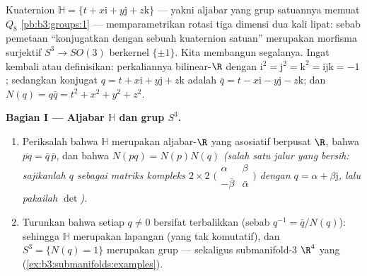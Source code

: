 \begin{problem}\label{pb:b3:submanifolds:1}
Kuaternion $\mathbb H = \{t + x\mathrm i + y\mathrm j +
z\mathrm k\}$ --- yakni aljabar yang grup satuannya memuat
$Q_8$ \cref{pb:b3:groups:1} --- memparametrikan
rotasi tiga dimensi dua kali lipat: sebab pemetaan ``konjugatkan
dengan sebuah kuaternion satuan'' merupakan morfisma surjektif $S^3 \to
SO(3)$ berkernel $\{\pm1\}$. Kita membangun segalanya.
Ingat kembali atau definisikan: perkaliannya bilinear-$\R$ dengan
$\mathrm i^2 = \mathrm j^2 = \mathrm k^2 =
\mathrm{ijk} = -1$; sedangkan konjugat $q = t + x\mathrm i +
y\mathrm j + z\mathrm k$ adalah $\bar q = t - x\mathrm i -
y\mathrm j - z\mathrm k$; dan $N(q) = q\bar q = t^2 + x^2 + y^2
+ z^2$.

\medskip
\noindent\textbf{Bagian I --- Aljabar $\mathbb H$ dan
grup $S^3$.}
\begin{enumerate}
  \item Periksalah bahwa $\mathbb H$ merupakan aljabar-$\R$ yang
        asosiatif berpusat $\R$, bahwa $\overline{pq} =
        \bar q\,\bar p$, dan bahwa $N(pq) = N(p)N(q)$
        \emph{(salah satu jalur yang bersih: sajikanlah $q$ sebagai
        matriks kompleks $2\times2$
        $\bigl(\begin{smallmatrix}\alpha & \beta\\
        -\bar\beta & \bar\alpha\end{smallmatrix}\bigr)$ dengan $q =
        \alpha + \beta\mathrm j$, lalu pakailah $\det$)}.
  \item Turunkan bahwa setiap $q \neq 0$ bersifat terbalikkan (sebab $q^{-1} =
        \bar q/N(q)$): sehingga $\mathbb H$ merupakan lapangan (yang tak
        komutatif), dan $S^3 = \{N(q) = 1\}$ merupakan grup ---
        sekaligus submanifold-$3$ $\R^4$ yang 
        (\cref{ex:b3:submanifolds:examples}).
\end{enumerate}


\end{problem}
